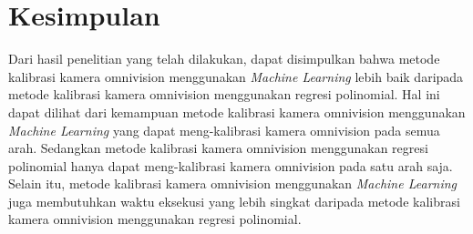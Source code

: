 \section{Kesimpulan}
\label{sec:kesimpulan}


Dari hasil penelitian yang telah dilakukan, dapat disimpulkan bahwa metode kalibrasi kamera omnivision menggunakan \emph{Machine Learning} lebih baik daripada metode kalibrasi kamera omnivision menggunakan regresi polinomial. Hal ini dapat dilihat dari kemampuan metode kalibrasi kamera omnivision menggunakan \emph{Machine Learning} yang dapat meng-kalibrasi kamera omnivision pada semua arah. Sedangkan metode kalibrasi kamera omnivision menggunakan regresi polinomial hanya dapat meng-kalibrasi kamera omnivision pada satu arah saja. Selain itu, metode kalibrasi kamera omnivision menggunakan \emph{Machine Learning} juga membutuhkan waktu eksekusi yang lebih singkat daripada metode kalibrasi kamera omnivision menggunakan regresi polinomial. 